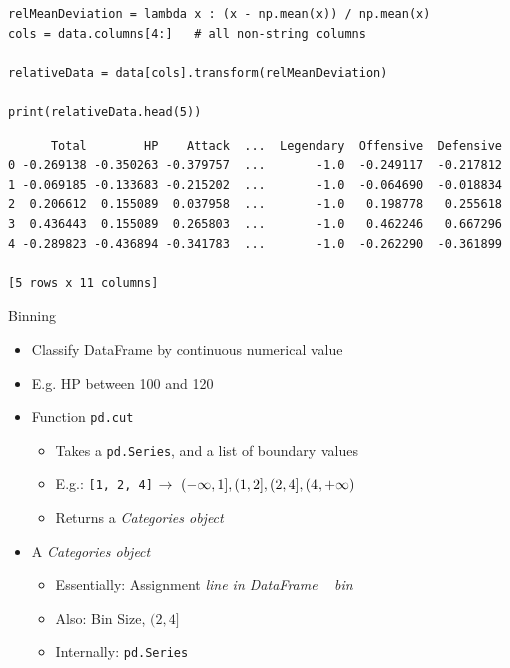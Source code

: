 \begin{frame}[fragile]
%
\begin{codebox}
\begin{verbatim}
relMeanDeviation = lambda x : (x - np.mean(x)) / np.mean(x)
cols = data.columns[4:]   # all non-string columns

relativeData = data[cols].transform(relMeanDeviation)

print(relativeData.head(5))
\end{verbatim}
\end{codebox}
%
\begin{cmdbox}
\begin{verbatim}
      Total        HP    Attack  ...  Legendary  Offensive  Defensive
0 -0.269138 -0.350263 -0.379757  ...       -1.0  -0.249117  -0.217812
1 -0.069185 -0.133683 -0.215202  ...       -1.0  -0.064690  -0.018834
2  0.206612  0.155089  0.037958  ...       -1.0   0.198778   0.255618
3  0.436443  0.155089  0.265803  ...       -1.0   0.462246   0.667296
4 -0.289823 -0.436894 -0.341783  ...       -1.0  -0.262290  -0.361899

[5 rows x 11 columns]
\end{verbatim}
\end{cmdbox}
%
\end{frame}


\begin{frame}{Binning}
%
\begin{itemize}
\item Classify DataFrame by continuous numerical value
\item E.\;g. HP between 100 and 120
\item Function \texttt{pd.cut}
	\begin{itemize}
	\item Takes a \texttt{pd.Series}, and a list of boundary values
	\item E.\;g.: \texttt{[1, 2, 4]} $\rightarrow ~ (-\infty, 1], (1, 2], (2, 4], (4, +\infty)$
	\item Returns a \emph{Categories object}
	\end{itemize}
\item A \emph{Categories object}
	\begin{itemize}
	\item Essentially: Assignment \emph{line in DataFrame} \thus~ \emph{bin}
	\item Also: Bin Size, \eg $(2, 4]$
	\item Internally: \texttt{pd.Series}
	\end{itemize}
\end{itemize}
%
\end{frame}

